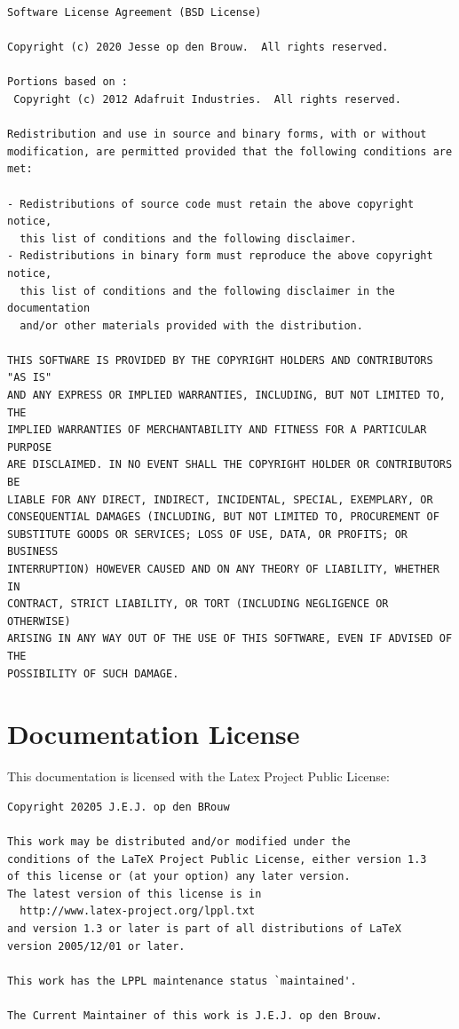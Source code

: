\documentclass[12pt]{article}
\begin{document}
\begin{lstlisting}[basicstyle=\footnotesize\ttfamily]
Software License Agreement (BSD License)

Copyright (c) 2020 Jesse op den Brouw.  All rights reserved.

Portions based on :
 Copyright (c) 2012 Adafruit Industries.  All rights reserved.

Redistribution and use in source and binary forms, with or without
modification, are permitted provided that the following conditions are met:

- Redistributions of source code must retain the above copyright notice,
  this list of conditions and the following disclaimer.
- Redistributions in binary form must reproduce the above copyright notice,
  this list of conditions and the following disclaimer in the documentation
  and/or other materials provided with the distribution.

THIS SOFTWARE IS PROVIDED BY THE COPYRIGHT HOLDERS AND CONTRIBUTORS "AS IS"
AND ANY EXPRESS OR IMPLIED WARRANTIES, INCLUDING, BUT NOT LIMITED TO, THE
IMPLIED WARRANTIES OF MERCHANTABILITY AND FITNESS FOR A PARTICULAR PURPOSE
ARE DISCLAIMED. IN NO EVENT SHALL THE COPYRIGHT HOLDER OR CONTRIBUTORS BE
LIABLE FOR ANY DIRECT, INDIRECT, INCIDENTAL, SPECIAL, EXEMPLARY, OR
CONSEQUENTIAL DAMAGES (INCLUDING, BUT NOT LIMITED TO, PROCUREMENT OF
SUBSTITUTE GOODS OR SERVICES; LOSS OF USE, DATA, OR PROFITS; OR BUSINESS
INTERRUPTION) HOWEVER CAUSED AND ON ANY THEORY OF LIABILITY, WHETHER IN
CONTRACT, STRICT LIABILITY, OR TORT (INCLUDING NEGLIGENCE OR OTHERWISE)
ARISING IN ANY WAY OUT OF THE USE OF THIS SOFTWARE, EVEN IF ADVISED OF THE
POSSIBILITY OF SUCH DAMAGE.
\end{lstlisting}


\section{Documentation License}
This documentation is licensed with the Latex Project Public License:

\begin{lstlisting}[basicstyle=\footnotesize\ttfamily,showspaces=false]
Copyright 20205 J.E.J. op den BRouw

This work may be distributed and/or modified under the
conditions of the LaTeX Project Public License, either version 1.3
of this license or (at your option) any later version.
The latest version of this license is in
  http://www.latex-project.org/lppl.txt
and version 1.3 or later is part of all distributions of LaTeX
version 2005/12/01 or later.

This work has the LPPL maintenance status `maintained'.
 
The Current Maintainer of this work is J.E.J. op den Brouw.
\end{lstlisting}
\end{document}
